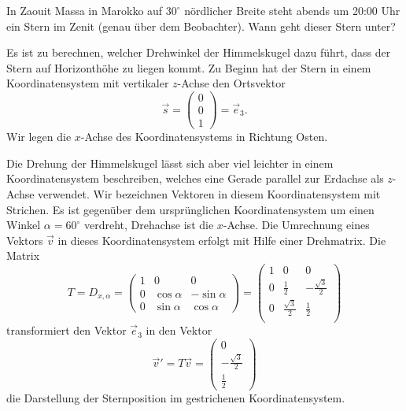 In Zaouit Massa in Marokko auf $30^\circ$ nördlicher Breite steht abends
um 20:00 Uhr ein Stern im Zenit (genau über dem Beobachter). Wann geht
dieser Stern unter?


\begin{loesung}
Es ist zu berechnen, welcher Drehwinkel der Himmelskugel dazu führt,
dass der Stern auf Horizonthöhe zu liegen kommt. Zu Beginn hat der
Stern in einem Koordinatensystem mit vertikaler $z$-Achse den
Ortsvektor
\[
\vec s=\begin{pmatrix}0\\0\\1\end{pmatrix}=\vec e_3.
\]
Wir legen die $x$-Achse des Koordinatensystems in Richtung Osten.

Die Drehung der Himmelskugel lässt sich aber viel leichter in einem
Koordinatensystem beschreiben, welches eine Gerade parallel zur Erdachse
als $z$-Achse verwendet. Wir bezeichnen Vektoren in diesem Koordinatensystem
mit Strichen. Es ist gegenüber dem ursprünglichen Koordinatensystem
um einen Winkel $\alpha=60^\circ$ verdreht, Drehachse ist die $x$-Achse.
Die Umrechnung eines Vektors $\vec v$ in dieses Koordinatensystem
erfolgt mit Hilfe einer Drehmatrix.
Die Matrix
\[
T=D_{x,\alpha}=\begin{pmatrix}
1&          0&          0\\
0& \cos\alpha&-\sin\alpha\\
0& \sin\alpha& \cos\alpha
\end{pmatrix}
=
\begin{pmatrix}
1& 0&0\\
0&\frac12&-\frac{\sqrt{3}}2\\
0&\frac{\sqrt{3}}2&\frac12\\
\end{pmatrix}
\]
transformiert den Vektor $\vec e_3$ in den Vektor
\[
\vec v'=T\vec v=
\begin{pmatrix}
0\\-\frac{\sqrt{3}}2\\\frac12 
\end{pmatrix}
\]
die Darstellung der Sternposition im gestrichenen Koordinatensystem.


\end{loesung}
